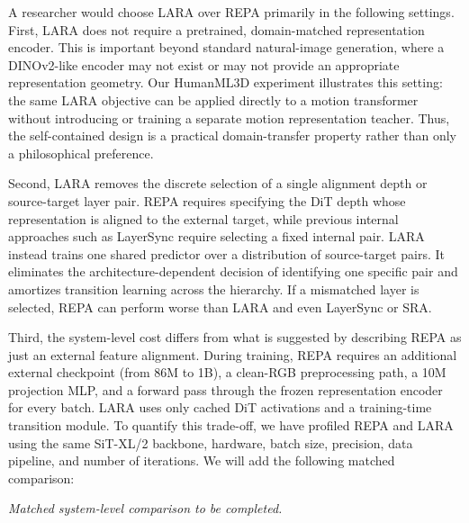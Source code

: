 \documentclass[10pt,letterpaper]{article}
\begin{document}
\begin{answerbox}

A researcher would choose LARA over REPA primarily in the following settings. First, LARA does not require a pretrained, domain-matched representation encoder. This is important beyond standard natural-image generation, where a DINOv2-like encoder may not exist or may not provide an appropriate representation geometry. Our HumanML3D experiment illustrates this setting: the same LARA objective can be applied directly to a motion transformer without introducing or training a separate motion representation teacher. Thus, the self-contained design is a practical domain-transfer property rather than only a philosophical preference.


Second, LARA removes the discrete selection of a single alignment depth or source-target layer pair. REPA requires specifying the DiT depth whose representation is aligned to the external target, while previous internal approaches such as LayerSync require selecting a fixed internal pair. LARA instead trains one shared predictor over a distribution of source-target pairs. It eliminates the architecture-dependent decision of identifying one specific pair and amortizes transition learning across the hierarchy. If a mismatched layer is selected, REPA can perform worse than LARA and even LayerSync or SRA.


Third, the system-level cost differs from what is suggested by describing REPA as \textquotedbl{}just an external feature alignment.\textquotedbl{} During training, REPA requires an additional external checkpoint (from 86M to 1B), a clean-RGB preprocessing path, a 10M projection MLP, and a forward pass through the frozen representation encoder for every batch. LARA uses only cached DiT activations and a training-time transition module. To quantify this trade-off, we have profiled REPA and LARA using the same SiT-XL/2 backbone, hardware, batch size, precision, data pipeline, and number of iterations. We will add the following matched comparison:


{\small\itshape\color{muted} Matched system-level comparison to be completed.\par}



\end{answerbox}
\end{document}
